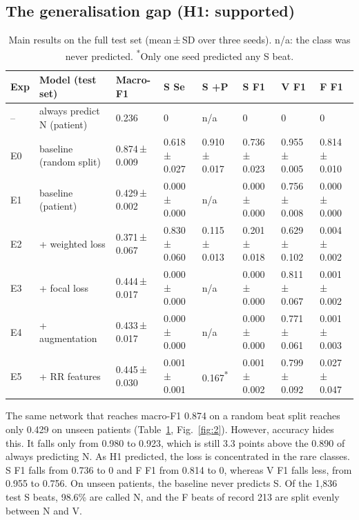 \documentclass[10pt,a4paper]{article}
\begin{document}
\subsection{The generalisation gap (H1: supported)}

\begin{table}[!htb]
\centering\small
\caption{Main results on the full test set (mean\,±\,SD over three seeds). n/a: the class was never predicted. \textsuperscript{*}Only one seed predicted any S beat.}\label{tab:2}
\begin{tabularx}{\linewidth}{l>{\raggedright\arraybackslash}Xllllll}
\toprule
\textbf{Exp} & \textbf{Model (test set)} & \textbf{Macro-F1} & \textbf{S Se} & \textbf{S +P} & \textbf{S F1} & \textbf{V F1} & \textbf{F F1} \\
\midrule
-- & always predict N (patient) & 0.236 & 0 & n/a & 0 & 0 & 0 \\
E0 & baseline (random split) & 0.874\,±\,0.009 & 0.618\,±\,0.027 & 0.910\,±\,0.017 & 0.736\,±\,0.023 & 0.955\,±\,0.005 & 0.814\,±\,0.010 \\
E1 & baseline (patient) & 0.429\,±\,0.002 & 0.000\,±\,0.000 & n/a & 0.000\,±\,0.000 & 0.756\,±\,0.008 & 0.000\,±\,0.000 \\
E2 & + weighted loss & 0.371\,±\,0.067 & 0.830\,±\,0.060 & 0.115\,±\,0.013 & 0.201\,±\,0.018 & 0.629\,±\,0.102 & 0.004\,±\,0.002 \\
E3 & + focal loss & 0.444\,±\,0.017 & 0.000\,±\,0.000 & n/a & 0.000\,±\,0.000 & 0.811\,±\,0.067 & 0.001\,±\,0.002 \\
E4 & + augmentation & 0.433\,±\,0.017 & 0.000\,±\,0.000 & n/a & 0.000\,±\,0.000 & 0.771\,±\,0.061 & 0.001\,±\,0.003 \\
E5 & + RR features & 0.445\,±\,0.030 & 0.001\,±\,0.001 & 0.167\textsuperscript{*} & 0.001\,±\,0.002 & 0.799\,±\,0.092 & 0.027\,±\,0.047 \\
\bottomrule
\end{tabularx}
\end{table}

The same network that reaches macro-F1 0.874 on a random beat split reaches only 0.429 on unseen patients (Table~\ref{tab:2}, Fig.~\ref{fig:2}). However, accuracy hides this. It falls only from 0.980 to 0.923, which is still 3.3 points above the 0.890 of always predicting N. As H1 predicted, the loss is concentrated in the rare classes. S F1 falls from 0.736 to 0 and F F1 from 0.814 to 0, whereas V F1 falls less, from 0.955 to 0.756. On unseen patients, the baseline never predicts S. Of the 1,836 test S beats, 98.6\% are called N, and the F beats of record 213 are split evenly between N and V.
\end{document}
